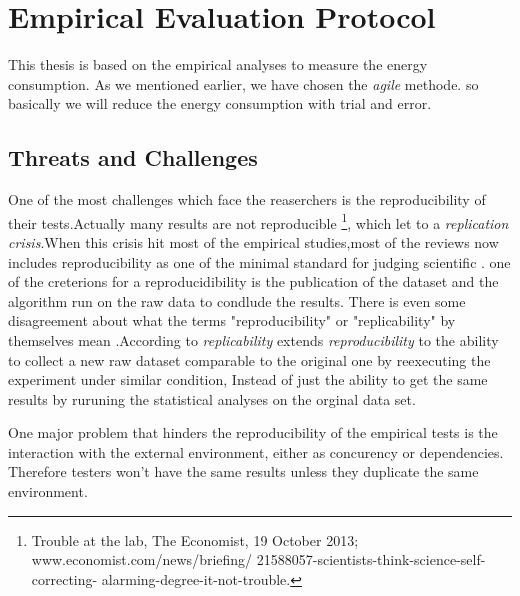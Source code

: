 \section{Empirical Evaluation Protocol}

This thesis is based on the empirical analyses to measure the energy consumption. As we mentioned earlier, we have chosen the \emph{agile} methode. so basically we will reduce the energy consumption with trial and error. 



\subsection{Threats and Challenges}


One of the most challenges which face the reaserchers is the reproducibility of their tests.Actually many results are not reproducible \footnote{Trouble at the lab, The Economist, 19 October 2013;  www.economist.com/news/briefing/ 21588057-scientists-think-science-self-correcting- alarming-degree-it-not-trouble.}, which let to a \emph{replication crisis}.When this crisis hit most of the empirical studies,most of the reviews now includes reproducibility as one of the minimal standard for judging scientific \cite{peng2011reproducible}. one of the creterions for a reproducidibility is the publication of the dataset and the algorithm run on the raw data to condlude the results. There is even some disagreement about what the terms "reproducibility" or "replicability" by themselves mean \cite{goodman2016does} .According to \cite{echtler2018open} \emph{replicability} extends \emph{reproducibility} to the ability to collect a new raw dataset comparable to the original one by reexecuting the experiment under similar condition, Instead of just the ability to get the same results by ruruning the statistical analyses on the orginal data set.

One major problem that hinders the reproducibility of the empirical tests is the interaction with the external environment, either as concurency or dependencies. Therefore testers won't have the same results unless they duplicate the same environment.
